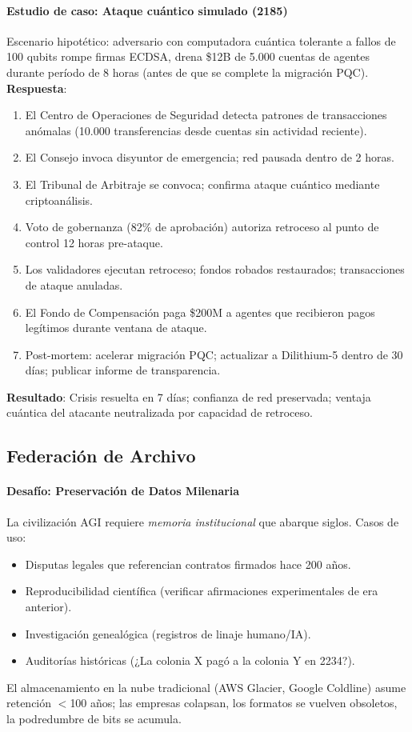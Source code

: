 \documentclass[11pt]{article}
\begin{document}
\paragraph{Estudio de caso: Ataque cuántico simulado (2185)}
Escenario hipotético: adversario con computadora cuántica tolerante a fallos de 100 qubits rompe firmas ECDSA, drena \$12B de 5.000 cuentas de agentes durante período de 8 horas (antes de que se complete la migración PQC).\\
\textbf{Respuesta}:
\begin{enumerate}[noitemsep]
  \item El Centro de Operaciones de Seguridad detecta patrones de transacciones anómalas (10.000 transferencias desde cuentas sin actividad reciente).
  \item El Consejo invoca disyuntor de emergencia; red pausada dentro de 2 horas.
  \item El Tribunal de Arbitraje se convoca; confirma ataque cuántico mediante criptoanálisis.
  \item Voto de gobernanza (82\% de aprobación) autoriza retroceso al punto de control 12 horas pre-ataque.
  \item Los validadores ejecutan retroceso; fondos robados restaurados; transacciones de ataque anuladas.
  \item El Fondo de Compensación paga \$200M a agentes que recibieron pagos legítimos durante ventana de ataque.
  \item Post-mortem: acelerar migración PQC; actualizar a Dilithium-5 dentro de 30 días; publicar informe de transparencia.
\end{enumerate}
\textbf{Resultado}: Crisis resuelta en 7 días; confianza de red preservada; ventaja cuántica del atacante neutralizada por capacidad de retroceso.

\subsection{Federación de Archivo}

\paragraph{Desafío: Preservación de Datos Milenaria}
La civilización AGI requiere \emph{memoria institucional} que abarque siglos. Casos de uso:
\begin{itemize}[noitemsep]
  \item Disputas legales que referencian contratos firmados hace 200 años.
  \item Reproducibilidad científica (verificar afirmaciones experimentales de era anterior).
  \item Investigación genealógica (registros de linaje humano/IA).
  \item Auditorías históricas (¿La colonia X pagó a la colonia Y en 2234?).
\end{itemize}
El almacenamiento en la nube tradicional (AWS Glacier, Google Coldline) asume retención $<$100 años; las empresas colapsan, los formatos se vuelven obsoletos, la podredumbre de bits se acumula.
\end{document}
